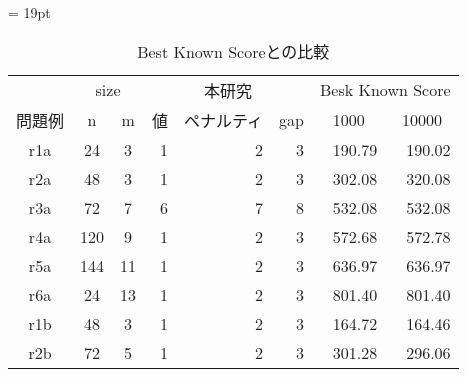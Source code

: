 \begin{table}[]
\tabcolsep = 19pt
\renewcommand{\arraystretch}{0.8}
\caption{Best Known Scoreとの比較}
\label{cordeau}
\begin{tabular}{ccclllll}
\hline
        & \multicolumn{2}{c}{size}                    & \multicolumn{3}{c}{本研究}                                                        & \multicolumn{2}{c}{Besk Known Score}                       \\ \cline{2-8}
問題例     & n                    & m                    & \multicolumn{1}{c}{値} & \multicolumn{1}{c}{ペナルティ} & \multicolumn{1}{c}{gap} & \multicolumn{1}{c}{1000} & \multicolumn{1}{c}{10000} \\ \cline{2-8}
r1a     & 24                   & 3                    & \multicolumn{1}{r}{1}    & \multicolumn{1}{r}{2}     & \multicolumn{1}{r}{3}   & \multicolumn{1}{r}{190.79}    & \multicolumn{1}{r}{190.02}     \\
r2a     & 48                   & 3                    & \multicolumn{1}{r}{1}    & \multicolumn{1}{r}{2}     & \multicolumn{1}{r}{3}   & \multicolumn{1}{r}{302.08}    & \multicolumn{1}{r}{320.08}     \\
r3a     & 72                   & 7                   & \multicolumn{1}{r}{6}    & \multicolumn{1}{r}{7}     & \multicolumn{1}{r}{8}   & \multicolumn{1}{r}{532.08}    & \multicolumn{1}{r}{532.08}     \\
r4a     & 120                   & 9                  & \multicolumn{1}{r}{1}    & \multicolumn{1}{r}{2}     & \multicolumn{1}{r}{3}   & \multicolumn{1}{r}{572.68}    & \multicolumn{1}{r}{572.78}     \\
r5a     & 144                  & 11                   & \multicolumn{1}{r}{1}    & \multicolumn{1}{r}{2}     & \multicolumn{1}{r}{3}   & \multicolumn{1}{r}{636.97}    & \multicolumn{1}{r}{636.97}     \\
r6a     & 24                   & 13                    & \multicolumn{1}{r}{1}    & \multicolumn{1}{r}{2}     & \multicolumn{1}{r}{3}   & \multicolumn{1}{r}{801.40}    & \multicolumn{1}{r}{801.40}     \\
r1b    & 48                  & 3                    & \multicolumn{1}{r}{1}    & \multicolumn{1}{r}{2}     & \multicolumn{1}{r}{3}   & \multicolumn{1}{r}{164.72}    & \multicolumn{1}{r}{164.46}     \\
r2b     & 72                  & 5                  & \multicolumn{1}{r}{1}    & \multicolumn{1}{r}{2}     & \multicolumn{1}{r}{3}   & \multicolumn{1}{r}{301.28}    & \multicolumn{1}{r}{296.06}     \\

\end{tabular}
\end{table}
